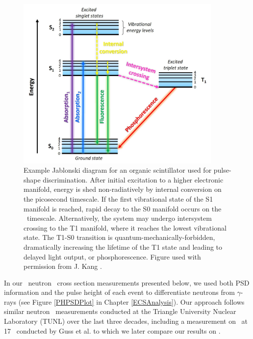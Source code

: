 \begin{figure}[tb]
    \centering
    \includegraphics[width = 0.9\textwidth]{figures/JablonskiExample_KangDissertation.png}
    \caption[Example Jablonski diagram for organic scintillator]
    {
        Example Jablonski diagram for an organic scintillator used for
        pulse-shape discrimination. After initial excitation to a higher
        electronic manifold, energy is shed non-radiatively by internal
        conversion on the picosecond timescale. If the first vibrational state of the S1
        manifold is reached, rapid decay to the S0 manifold occurs on the
        \nano\second\ timescale. Alternatively, the system may undergo intersystem
        crossing to the T1 manifold, where it reaches the lowest vibrational
        state. The T1-S0 transition is quantum-mechanically-forbidden,
        dramatically increasing the lifetime of the T1 state and leading to
        delayed light output, or phosphorescence. Figure used with permission 
        from J. Kang \cite{KangPhDThesis}. 
    }
    \label{JablonskiExample}
\end{figure}

In our \snTwelveFour\ neutron \el\ cross section measurements presented below,
we used both \gls{PSD} information and the pulse height of each event to
differentiate neutrons
from $\gamma$-rays (see Figure \ref{PHPSDPlot} in Chapter
\ref{ECSAnalysis}). Our approach follows similar neutron \el\ measurements
conducted at the Triangle University Nuclear Laboratory (\gls{TUNL}) over the last three decades,
including a measurement on \snTwenty\ at 17 \mega\electronvolt\ conducted by Guss et al.
\cite{Guss1989, GussPhDThesis} to which we later compare our results on
\snTwelveFour.

